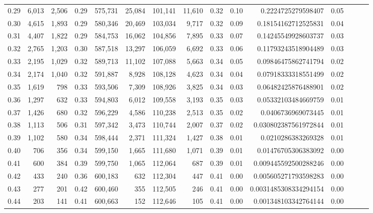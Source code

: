 \begin{tabular}{rrrrrrrrrrrrrrr}
0.29 &   6,013 &  2,506 &  0.29 &  575,731 &   25,084 &  101,141 &   11,610 &  0.32 &  0.10 &      0.2224725279598407 &      0.05 \\
0.30 &   4,615 &  1,893 &  0.29 &  580,346 &   20,469 &  103,034 &    9,717 &  0.32 &  0.09 &     0.18154162712525831 &      0.04 \\
0.31 &   4,407 &  1,822 &  0.29 &  584,753 &   16,062 &  104,856 &    7,895 &  0.33 &  0.07 &     0.14245549928603737 &      0.03 \\
0.32 &   2,765 &  1,203 &  0.30 &  587,518 &   13,297 &  106,059 &    6,692 &  0.33 &  0.06 &     0.11793243518904489 &      0.03 \\
0.33 &   2,195 &  1,029 &  0.32 &  589,713 &   11,102 &  107,088 &    5,663 &  0.34 &  0.05 &     0.09846475862741794 &      0.02 \\
0.34 &   2,174 &  1,040 &  0.32 &  591,887 &    8,928 &  108,128 &    4,623 &  0.34 &  0.04 &     0.07918333318551499 &      0.02 \\
0.35 &   1,619 &    798 &  0.33 &  593,506 &    7,309 &  108,926 &    3,825 &  0.34 &  0.03 &     0.06482425876488901 &      0.02 \\
0.36 &   1,297 &    632 &  0.33 &  594,803 &    6,012 &  109,558 &    3,193 &  0.35 &  0.03 &     0.05332103484669759 &      0.01 \\
0.37 &   1,426 &    680 &  0.32 &  596,229 &    4,586 &  110,238 &    2,513 &  0.35 &  0.02 &      0.0406736969073445 &      0.01 \\
0.38 &   1,113 &    506 &  0.31 &  597,342 &    3,473 &  110,744 &    2,007 &  0.37 &  0.02 &    0.030802387561972844 &      0.01 \\
0.39 &   1,102 &    580 &  0.34 &  598,444 &    2,371 &  111,324 &    1,427 &  0.38 &  0.01 &      0.0210286383269328 &      0.01 \\
0.40 &     706 &    356 &  0.34 &  599,150 &    1,665 &  111,680 &    1,071 &  0.39 &  0.01 &     0.01476705306383092 &      0.00 \\
0.41 &     600 &    384 &  0.39 &  599,750 &    1,065 &  112,064 &      687 &  0.39 &  0.01 &    0.009445592500288246 &      0.00 \\
0.42 &     433 &    240 &  0.36 &  600,183 &      632 &  112,304 &      447 &  0.41 &  0.00 &    0.005605271793598283 &      0.00 \\
0.43 &     277 &    201 &  0.42 &  600,460 &      355 &  112,505 &      246 &  0.41 &  0.00 &   0.0031485308334294154 &      0.00 \\
0.44 &     203 &    141 &  0.41 &  600,663 &      152 &  112,646 &      105 &  0.41 &  0.00 &    0.001348103342764144 &      0.00 \\

\end{tabular}
